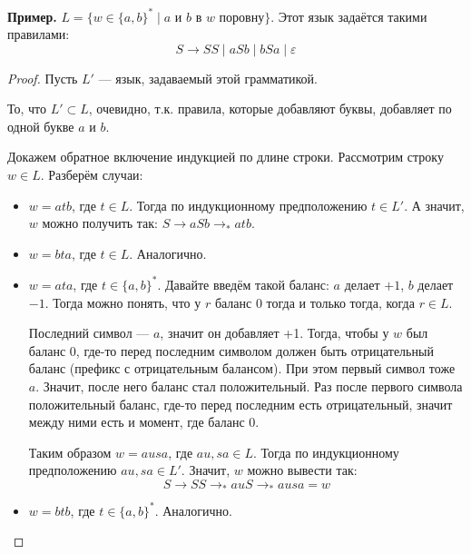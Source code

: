 \textbf{Пример.} $L = \{ w \in \{ a, b \}^* \mid \text{$a$ и $b$ в $w$ поровну} \} $. Этот язык задаётся такими правилами:
$$ S \to S S \mid a S b \mid b S a \mid \varepsilon $$
\begin{proof}
    Пусть $L'$ --- язык, задаваемый этой грамматикой.
    
    То, что $L' \subset L$, очевидно, т.к. правила, которые добавляют буквы, добавляет по одной букве $a$ и $b$.

    Докажем обратное включение индукцией по длине строки. Рассмотрим строку $w \in L$. Разберём случаи:
    \begin{itemize}
        \item $w = a t b$, где $t \in L$. Тогда по индукционному предположению $t \in L'$. А значит, $w$ можно получить так: $S \to aSb \to_* atb$.
        \item $w = b t a$, где $t \in L$. Аналогично.
        \item $w = a t a$, где $t \in \{a, b\}^*$. Давайте введём такой баланс: $a$ делает $+1$, $b$ делает $-1$. Тогда можно понять, что у $r$ баланс 0 тогда и только тогда, когда $r \in L$. 
        
        Последний символ --- $a$, значит он добавляет +1. Тогда, чтобы у $w$ был баланс 0, где-то перед последним символом должен быть отрицательный баланс (префикс с отрицательным балансом). При этом первый символ тоже $a$. Значит, после него баланс стал положительный. Раз после первого символа положительный баланс, где-то перед последним есть отрицательный, значит между ними есть и момент, где баланс 0.

        Таким образом $w = ausa$, где $au, sa \in L$. Тогда по индукционному предположению $au, sa \in L'$. Значит, $w$ можно вывести так:
        $$ S \to S S \to_* au S \to_* ausa = w $$

        \item $w = b t b$, где $t \in \{a, b\}^*$. Аналогично.
    \end{itemize}
\end{proof}


